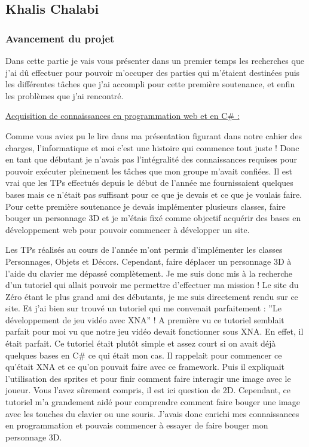 \documentclass{article}
\begin{document}
\subsection{Khalis Chalabi}

\subsubsection{Avancement du projet}

Dans cette partie je vais vous présenter dans un premier temps les recherches que j’ai dû effectuer pour pouvoir m’occuper des parties qui m’étaient destinées puis les différentes tâches que j’ai  accompli pour cette première soutenance, et enfin les problèmes que j’ai rencontré.
\newline

\par
\underline{Acquisition de connaissances en programmation web et en C\# :}
\newline

\par
Comme vous aviez pu le lire dans ma présentation figurant dans notre cahier des charges, l’informatique et moi c’est une histoire qui commence tout juste ! Donc en tant que débutant je n’avais pas l'intégralité des connaissances requises pour pouvoir exécuter pleinement les tâches que mon groupe m’avait confiées. Il est vrai que les TPs effectués depuis le début de l’année me fournissaient quelques bases mais ce n’était pas suffisant pour ce que je devais et ce que je voulais faire. Pour cette première soutenance je devais implémenter plusieurs classes, faire bouger un personnage 3D et je m’étais fixé comme objectif acquérir des bases en développement web pour pouvoir commencer à développer un site.
\newline

\par
Les TPs réalisés au cours de l’année m’ont permis d’implémenter les classes Personnages, Objets et Décors. Cependant, faire déplacer un personnage 3D à l’aide du clavier me dépassé complètement. Je me suis donc mis à la recherche d’un tutoriel qui allait pouvoir me permettre d’effectuer ma mission ! Le site du Zéro étant le plus grand ami des débutants, je me suis directement rendu sur ce site. Et j’ai bien sur trouvé un tutoriel qui me convenait parfaitement : ''Le développement de jeu vidéo avec XNA'' ! A première vu ce tutoriel semblait parfait pour moi vu que notre jeu vidéo devait fonctionner sous XNA. En effet, il était parfait. Ce tutoriel était plutôt simple et assez court si on avait déjà quelques bases en  C\# ce qui était mon cas. Il rappelait pour commencer ce qu'était XNA et ce qu'on pouvait faire avec ce framework. Puis il expliquait l'utilisation des sprites et pour finir comment faire interagir une image avec le joueur. Vous l'avez sûrement compris, il est ici question de 2D. Cependant, ce tutoriel m'a grandement aidé pour comprendre comment faire bouger une image avec les touches du clavier ou une souris. J'avais donc enrichi mes connaissances en programmation et pouvais commencer à essayer de faire bouger mon personnage 3D.
\newline
\end{document}
